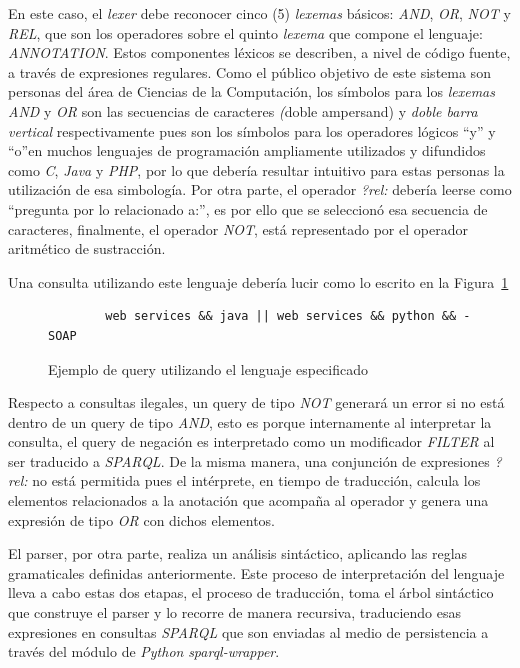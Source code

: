 \begin{itemize}
En este caso, el \textit{lexer} debe reconocer cinco (5) \textit{lexemas} básicos: \textit{AND}, \textit{OR}, \textit{NOT} y \textit{REL}, que son los operadores sobre el quinto \textit{lexema} que compone el lenguaje: \textit{ANNOTATION}. Estos componentes léxicos se describen, a nivel de código fuente, a través de expresiones regulares. Como el público objetivo de este sistema son personas del área de Ciencias de la Computación, los símbolos para los \textit{lexemas} \textit{AND} y \textit{OR} son las secuencias de caracteres \textit(doble ampersand) y \textit{doble barra vertical} respectivamente pues son los símbolos para los operadores lógicos ``y'' y ``o''en muchos lenguajes de programación ampliamente utilizados y difundidos como \textit{C}, \textit{Java} y \textit{PHP}, por lo que debería resultar intuitivo para estas personas la utilización de esa simbología. Por otra parte, el operador \textit{?rel:} debería leerse como ``pregunta por lo relacionado a:'', es por ello que se seleccionó esa secuencia de caracteres, finalmente, el operador \textit{NOT}, está representado por el operador aritmético de sustracción.

Una consulta utilizando este lenguaje debería lucir como lo escrito en la Figura~\ref{SimpleQueryExample}

\begin{figure}[!h]
    \begin{center}
        \begin{verbatim}
        web services && java || web services && python && -SOAP
        \end{verbatim}
        \caption{Ejemplo de query utilizando el lenguaje especificado}
        \label{SimpleQueryExample}
    \end{center}
\end{figure}

Respecto a consultas ilegales, un query de tipo \textit{NOT} generará un error si no está dentro de un query de tipo \textit{AND}, esto es porque internamente al interpretar la consulta, el query de negación es interpretado como un modificador \textit{FILTER} al ser traducido a \textit{SPARQL}. De la misma manera, una conjunción de expresiones \textit{?rel:} no está permitida pues el intérprete, en tiempo de traducción, calcula los elementos relacionados a la anotación que acompaña al operador y genera una expresión de tipo \textit{OR} con dichos elementos.

El parser, por otra parte, realiza un análisis sintáctico, aplicando las reglas gramaticales definidas anteriormente. Este proceso de interpretación del lenguaje lleva a cabo estas dos etapas, el proceso de traducción, toma el árbol sintáctico que construye el parser y lo recorre de manera recursiva, traduciendo esas expresiones en consultas \textit{SPARQL} que son enviadas al medio de persistencia a través del módulo de \textit{Python} \textit{sparql-wrapper}.


\end{itemize}
